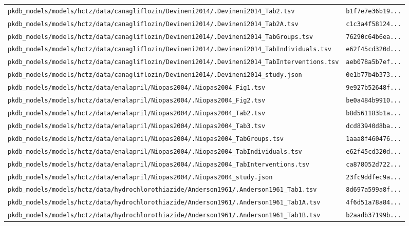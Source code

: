 \begin{longtable}{ll}
\texttt{pkdb\_models/models/hctz/data/canagliflozin/Devineni2014/.Devineni2014\_Tab2.tsv} & \texttt{b1f7e7e36b19...} \\
\texttt{pkdb\_models/models/hctz/data/canagliflozin/Devineni2014/.Devineni2014\_Tab2A.tsv} & \texttt{c1c3a4f58124...} \\
\texttt{pkdb\_models/models/hctz/data/canagliflozin/Devineni2014/.Devineni2014\_TabGroups.tsv} & \texttt{76290c64b6ea...} \\
\texttt{pkdb\_models/models/hctz/data/canagliflozin/Devineni2014/.Devineni2014\_TabIndividuals.tsv} & \texttt{e62f45cd320d...} \\
\texttt{pkdb\_models/models/hctz/data/canagliflozin/Devineni2014/.Devineni2014\_TabInterventions.tsv} & \texttt{aeb078a5b7ef...} \\
\texttt{pkdb\_models/models/hctz/data/canagliflozin/Devineni2014/.Devineni2014\_study.json} & \texttt{0e1b77b4b373...} \\
\texttt{pkdb\_models/models/hctz/data/enalapril/Niopas2004/.Niopas2004\_Fig1.tsv} & \texttt{9e927b52648f...} \\
\texttt{pkdb\_models/models/hctz/data/enalapril/Niopas2004/.Niopas2004\_Fig2.tsv} & \texttt{be0a484b9910...} \\
\texttt{pkdb\_models/models/hctz/data/enalapril/Niopas2004/.Niopas2004\_Tab2.tsv} & \texttt{b8d561183b1a...} \\
\texttt{pkdb\_models/models/hctz/data/enalapril/Niopas2004/.Niopas2004\_Tab3.tsv} & \texttt{dcd83940d8ba...} \\
\texttt{pkdb\_models/models/hctz/data/enalapril/Niopas2004/.Niopas2004\_TabGroups.tsv} & \texttt{1aaa8f460476...} \\
\texttt{pkdb\_models/models/hctz/data/enalapril/Niopas2004/.Niopas2004\_TabIndividuals.tsv} & \texttt{e62f45cd320d...} \\
\texttt{pkdb\_models/models/hctz/data/enalapril/Niopas2004/.Niopas2004\_TabInterventions.tsv} & \texttt{ca878052d722...} \\
\texttt{pkdb\_models/models/hctz/data/enalapril/Niopas2004/.Niopas2004\_study.json} & \texttt{23fc9ddfec9a...} \\
\texttt{pkdb\_models/models/hctz/data/hydrochlorothiazide/Anderson1961/.Anderson1961\_Tab1.tsv} & \texttt{8d697a599a8f...} \\
\texttt{pkdb\_models/models/hctz/data/hydrochlorothiazide/Anderson1961/.Anderson1961\_Tab1A.tsv} & \texttt{4f6d51a78a84...} \\
\texttt{pkdb\_models/models/hctz/data/hydrochlorothiazide/Anderson1961/.Anderson1961\_Tab1B.tsv} & \texttt{b2aadb37199b...} \\

\end{longtable}
